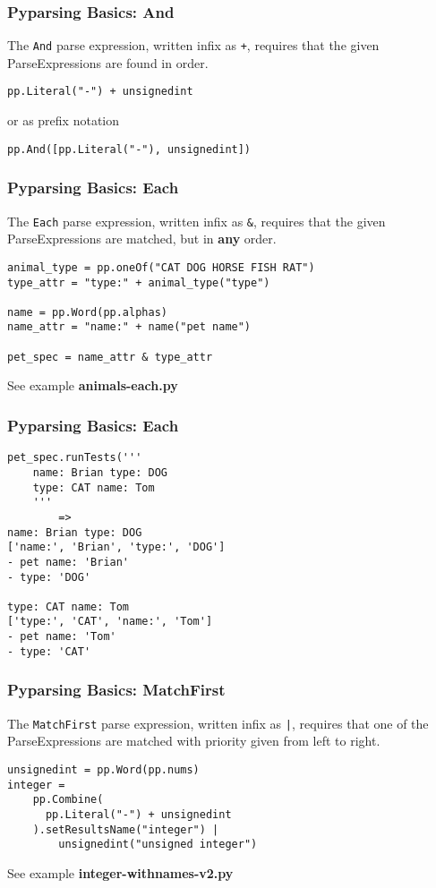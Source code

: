 \documentclass{beamer}
\begin{document}
\begin{frame}[fragile]
\frametitle{Pyparsing Basics: And}
The \texttt{And} parse expression, written infix as \texttt{+}, requires that the given ParseExpressions are found in order.

\begin{verbatim} 
pp.Literal("-") + unsignedint
\end{verbatim}

or as prefix notation
\begin{verbatim} 
pp.And([pp.Literal("-"), unsignedint])
\end{verbatim}

\end{frame}



\begin{frame}[fragile]
\frametitle{Pyparsing Basics: Each}
The \texttt{Each} parse expression, written infix as \texttt{\&}, requires that the given ParseExpressions are matched, but in \textbf{any} order.
\begin{verbatim}
animal_type = pp.oneOf("CAT DOG HORSE FISH RAT")
type_attr = "type:" + animal_type("type")

name = pp.Word(pp.alphas)
name_attr = "name:" + name("pet name")

pet_spec = name_attr & type_attr
\end{verbatim}
See example \textbf{animals-each.py}
\end{frame}



\begin{frame}[fragile]
\frametitle{Pyparsing Basics: Each}
\begin{verbatim}
pet_spec.runTests('''
    name: Brian type: DOG
    type: CAT name: Tom
    '''
        =>	
name: Brian type: DOG
['name:', 'Brian', 'type:', 'DOG']
- pet name: 'Brian'
- type: 'DOG'

type: CAT name: Tom
['type:', 'CAT', 'name:', 'Tom']
- pet name: 'Tom'
- type: 'CAT'
\end{verbatim}
\end{frame}

\begin{frame}[fragile]
\frametitle{Pyparsing Basics: MatchFirst}
The \texttt{MatchFirst} parse expression, written infix as \texttt{|}, requires that one of the ParseExpressions are matched with priority given from left to right.
\begin{verbatim}
unsignedint = pp.Word(pp.nums)
integer = 
    pp.Combine(
      pp.Literal("-") + unsignedint
    ).setResultsName("integer") | 
        unsignedint("unsigned integer")
\end{verbatim} 
See example \textbf{integer-withnames-v2.py}
\end{frame}
\end{document}
